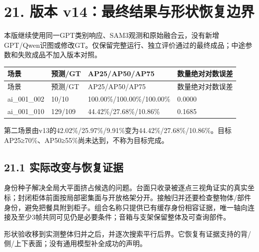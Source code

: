 \documentclass[UTF8,fontset=fandol]{ctexart}
\begin{document}
\section*{21. 版本 v14：最终结果与形状恢复边界}

本版继续使用同一GPT类别响应、SAM3观测和原始融合云，没有新增GPT/Qwen识图或修改GT。仅保留完整运行、独立评价通过的最终成品；中途参数和失败成品不加入版本对照。



{\small
\begin{longtable}{|p{}|p{}|p{}|p{}|}
\hline
场景 & 预测/GT & AP25/AP50/AP75 & 数量绝对对数误差 \\ \hline
\endfirsthead
\hline
场景 & 预测/GT & AP25/AP50/AP75 & 数量绝对对数误差 \\ \hline
\endhead
ai\_001\_002 & 10/10 & 100.00\%/100.00\%/100.00\% & 0.0000 \\ \hline
ai\_001\_010 & 129/109 & 44.42\%/27.68\%/10.86\% & 0.1685 \\ \hline
\end{longtable}
}

第二场景由v13的42.02\%/25.97\%/9.91\%变为44.42\%/27.68\%/10.86\%。目标AP25≥70\%、AP50≥55\%尚未达到，不称为目标完成。



\subsection*{21.1 实际改变与恢复证据}

身份种子解决全局大平面挤占候选的问题。台面只收录被逐点三视角证实的真实坐标；封闭柜体前面按局部密集面与开放格架分开。接触归并还要检查整物体/部件身份，避免把餐具附到柜子。组合名称只提供已有缓存身份相容证据，唯一轴向连接及至少3帧共同可见仍是必要条件；音箱与支架保留整体及可查询部件。



形状验收移到实测整体归并之后，并逐次搜索平行后界。它恢复有证据支持的背/侧/上下表面；没有通用模型补全成功的声明。
\end{document}
